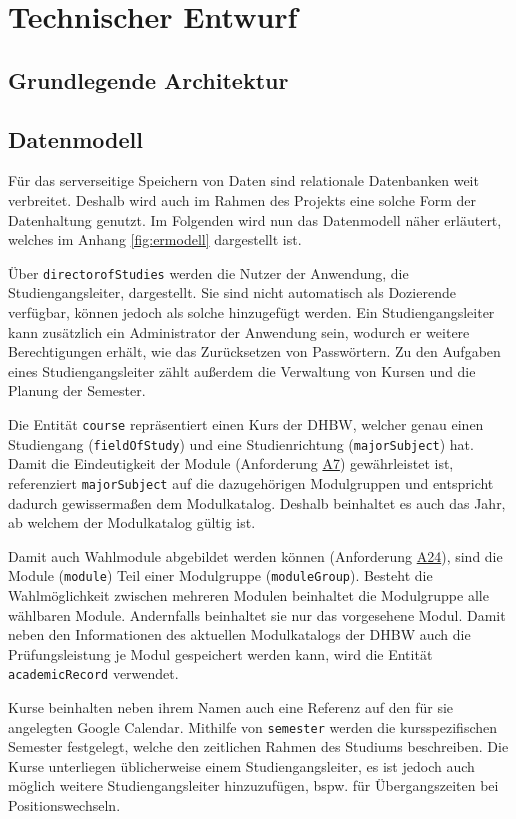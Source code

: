 \section{Technischer Entwurf}
\subsection{Grundlegende Architektur}

\subsection{Datenmodell}
Für das serverseitige Speichern von Daten sind relationale Datenbanken weit verbreitet.
Deshalb wird auch im Rahmen des Projekts eine solche Form der Datenhaltung genutzt.
Im Folgenden wird nun das Datenmodell näher erläutert, welches im Anhang \ref{fig:ermodell} dargestellt ist.  

Über \texttt{directorofStudies} werden die Nutzer der Anwendung, die Studiengangsleiter, dargestellt.
Sie sind nicht automatisch als Dozierende verfügbar, können jedoch als solche hinzugefügt werden.
Ein Studiengangsleiter kann zusätzlich ein Administrator der Anwendung sein, wodurch er weitere Berechtigungen erhält, wie das Zurücksetzen von Passwörtern.
Zu den Aufgaben eines Studiengangsleiter zählt außerdem die Verwaltung von Kursen und die Planung der Semester. 

Die Entität \texttt{course} repräsentiert einen Kurs der \ac{DHBW}, welcher genau einen Studiengang (\texttt{fieldOfStudy}) und eine Studienrichtung (\texttt{majorSubject}) hat.
Damit die Eindeutigkeit der Module (Anforderung \hyperref[tab:Anforderungen]{A7}) gewährleistet ist, referenziert \texttt{majorSubject} auf die dazugehörigen Modulgruppen und entspricht dadurch gewissermaßen dem Modulkatalog.
Deshalb beinhaltet es auch das Jahr, ab welchem der Modulkatalog gültig ist. 

Damit auch Wahlmodule abgebildet werden können (Anforderung \hyperref[tab:Anforderungen]{A24}), sind die Module (\texttt{module}) Teil einer Modulgruppe (\texttt{moduleGroup}).
Besteht die Wahlmöglichkeit zwischen mehreren Modulen beinhaltet die Modulgruppe alle wählbaren Module.
Andernfalls beinhaltet sie nur das vorgesehene Modul.
Damit neben den Informationen des aktuellen Modulkatalogs der \ac{DHBW} auch die Prüfungsleistung je Modul gespeichert werden kann, wird die Entität \texttt{academicRecord} verwendet.

Kurse beinhalten neben ihrem Namen auch eine Referenz auf den für sie angelegten Google Calendar. 
Mithilfe von \texttt{semester} werden die kursspezifischen Semester festgelegt, welche den zeitlichen Rahmen des Studiums beschreiben.
Die Kurse unterliegen üblicherweise einem Studiengangsleiter, es ist jedoch auch möglich weitere Studiengangsleiter hinzuzufügen, bspw. für Übergangszeiten bei Positionswechseln.

